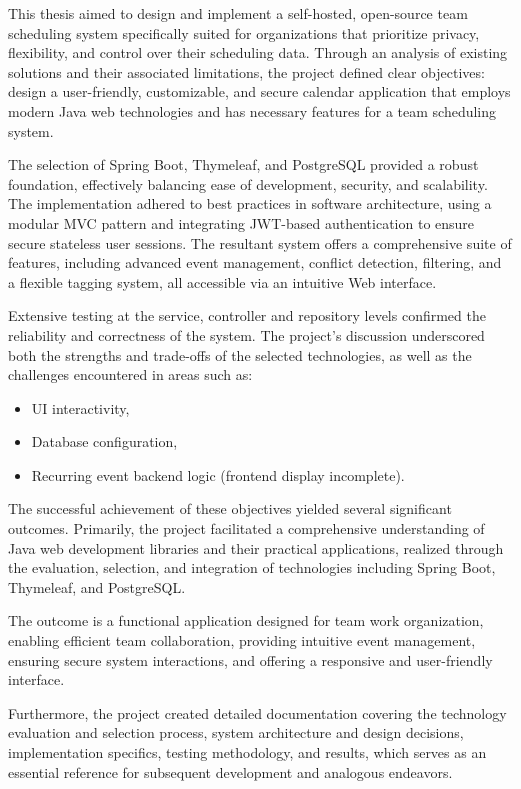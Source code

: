 This thesis aimed to design and implement a self-hosted, open-source team scheduling system specifically suited for organizations that prioritize privacy, flexibility, and control over their scheduling data.
Through an analysis of existing solutions and their associated limitations, the project defined clear objectives:
design a user-friendly, customizable, and secure calendar application that employs modern Java web technologies and has necessary features for a team scheduling system.

The selection of Spring Boot, Thymeleaf, and PostgreSQL provided a robust foundation, effectively balancing ease of development, security, and scalability.
The implementation adhered to best practices in software architecture, using a modular MVC pattern and integrating JWT-based authentication to ensure secure stateless user sessions.
The resultant system offers a comprehensive suite of features, including advanced event management, conflict detection, filtering, and a flexible tagging system, all accessible via an intuitive Web interface.

Extensive testing at the service, controller and repository levels confirmed the reliability and correctness of the system.
The project's discussion underscored both the strengths and trade-offs of the selected technologies, as well as the challenges encountered in areas such as:
\begin{itemize}
    \item UI interactivity,
    \item Database configuration,
    \item Recurring event backend logic (frontend display incomplete).
\end{itemize}
The successful achievement of these objectives yielded several significant outcomes.
Primarily, the project facilitated a comprehensive understanding of Java web development libraries and their practical applications, realized through the evaluation, selection, and integration of technologies including Spring Boot, Thymeleaf, and PostgreSQL\@.

The outcome is a functional application designed for team work organization, enabling efficient team collaboration, providing intuitive event management, ensuring secure system interactions, and offering a responsive and user-friendly interface.

Furthermore, the project created detailed documentation covering the technology evaluation and selection process, system architecture and design decisions, implementation specifics, testing methodology, and results, which serves as an essential reference for subsequent development and analogous endeavors.

